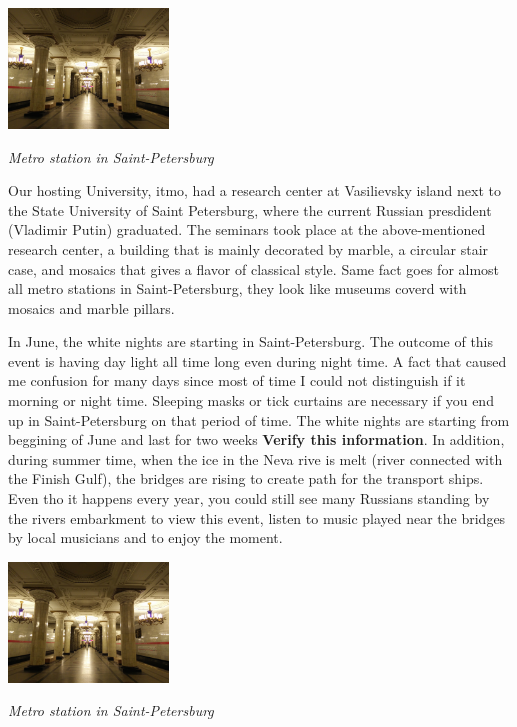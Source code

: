 \documentclass[10pt,a4paper]{article} %
\begin{document}
\begin{multicols}{3}
\begin{center}
	\includegraphics[width=0.32\textwidth]{media/spb_metro_station.jpg}
	\par\textit{Metro station in Saint-Petersburg}
\end{center}


Our hosting University, {\sc itmo}, had a research center at Vasilievsky island 
next to the State University of Saint Petersburg, where the current Russian 
presdident (Vladimir Putin) graduated. 
The seminars took place at the above-mentioned research center, a building that 
is mainly decorated by marble, a circular stair case, 
and mosaics that gives a flavor of classical style. 
Same fact goes for almost all metro stations in Saint-Petersburg, they look like 
museums coverd with mosaics and marble pillars. 

 
In June, the white nights are starting in Saint-Petersburg. 
The outcome of this event is having day light all time long even during night 
time. 
A fact that caused me confusion for many days since most of time I could not 
distinguish if it morning or night time. 
Sleeping masks or tick curtains are necessary if you end up in Saint-Petersburg 
on that period of time. 
The white nights are starting from beggining of June and last for two weeks 
\textbf{Verify this information}.
In addition, during summer time, when the ice in the Neva rive is melt (river 
connected with the Finish Gulf), the bridges are rising to create path for the 
transport ships. 
Even tho it happens every year, you could still see many Russians standing by the 
rivers embarkment to view this event, listen to music played near the bridges by 
local musicians and to enjoy the moment.


 
 
\begin{center}
	\includegraphics[width=0.32\textwidth]{media/spb_metro_station.jpg}
	\par\textit{Metro station in Saint-Petersburg}
\end{center}



\end{multicols}
\end{document}
